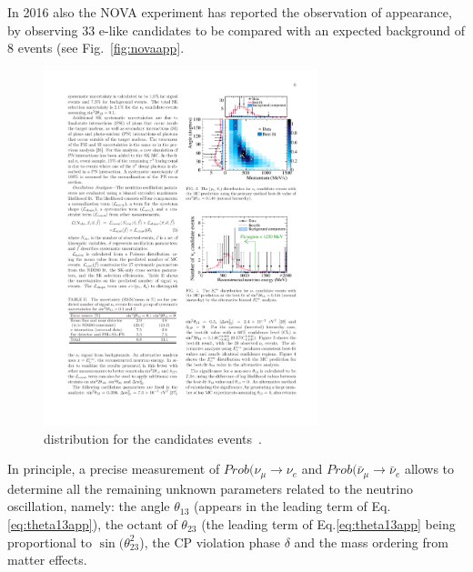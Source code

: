 In 2016 also the NOVA experiment has reported the observation of \nue appearance, by observing 33 e-like candidates to be compared with an expected background of 8 events (see Fig.~\ref{fig:novaapp}.

\begin{figure} [htbp!]
\begin{center}
\includegraphics[width=8cm]{figures/nueapp_ptheta.pdf}
\caption{\label{fig:t2kapp} \ptheta distribution for the \nue candidates events~\cite{Abe:2013hdq}.}
\end{center}
\end{figure}


In principle, a precise measurement of $Prob(\nu_\mu \rightarrow \nu_e$ and 
$Prob(\bar{\nu}_\mu \rightarrow \bar{\nu}_e$ allows to determine all the remaining unknown parameters related to the neutrino oscillation, namely: the angle
$\theta_{13}$ (appears in the leading term of Eq.\ref{eq:theta13app}), the octant of $\theta_{23}$ (the leading term of Eq.\ref{eq:theta13app} being proportional to $\sin (\theta^2_{23}$), the CP violation phase $\delta$ and the mass ordering from matter effects. 

